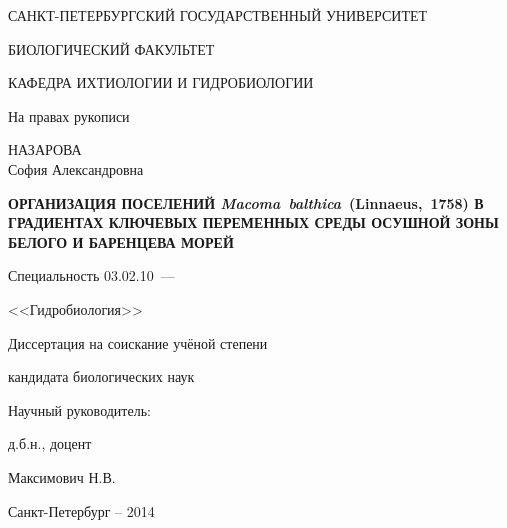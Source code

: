 \thispagestyle{empty}

\begin{center}
САНКТ-ПЕТЕРБУРГСКИЙ ГОСУДАРСТВЕННЫЙ УНИВЕРСИТЕТ\par
БИОЛОГИЧЕСКИЙ ФАКУЛЬТЕТ\par
КАФЕДРА ИХТИОЛОГИИ И ГИДРОБИОЛОГИИ\par  
\par
\end{center}

\vspace{20mm}
\begin{flushright}
На правах рукописи

\end{flushright}

\vspace{30mm}
\begin{center}
{\large НАЗАРОВА\\ София Александровна}
\end{center}

\vspace{5mm}
\begin{center}
{\bfseries \large ОРГАНИЗАЦИЯ ПОСЕЛЕНИЙ {\itshape Macoma~balthica}~(Linnaeus,~1758) В ГРАДИЕНТАХ КЛЮЧЕВЫХ ПЕРЕМЕННЫХ СРЕДЫ ОСУШНОЙ ЗОНЫ БЕЛОГО И БАРЕНЦЕВА МОРЕЙ
\par}

\vspace{10mm}
{%
Специальность 03.02.10~---

<<Гидробиология>>
}

\vspace{10mm}
Диссертация на соискание учёной степени

кандидата биологических наук
\end{center}

\vspace{20mm}
\begin{flushright}
Научный руководитель:

д.б.н., доцент

Максимович Н.В.

\end{flushright}

\vspace{20mm}
\begin{center}
{Санкт-Петербург  -- 2014}
\end{center}

\newpage
